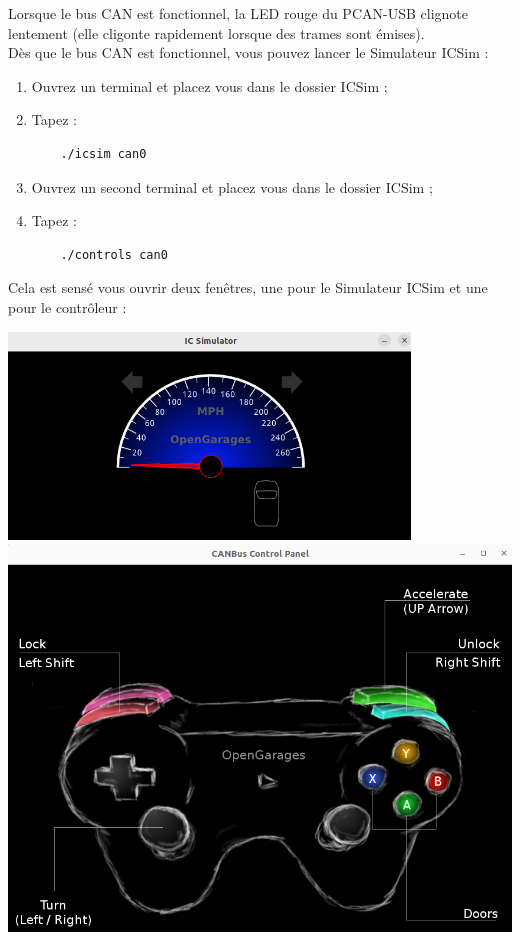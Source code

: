 Lorsque le bus CAN est fonctionnel, la LED rouge du PCAN-USB clignote lentement (elle cligonte rapidement lorsque des trames sont émises).\\

Dès que le bus CAN est fonctionnel, vous pouvez lancer le Simulateur ICSim :
\begin{enumerate}
    \item Ouvrez un terminal et placez vous dans le dossier ICSim ;
    \item Tapez :
\vspace{-1.8\baselineskip}
\begin{lstlisting}
    ./icsim can0
\end{lstlisting}
    \item Ouvrez un second terminal et placez vous dans le dossier ICSim ;
    \item Tapez :
\vspace{-1.8\baselineskip}
\begin{lstlisting}
    ./controls can0
\end{lstlisting}
\end{enumerate}

Cela est sensé vous ouvrir deux fenêtres, une pour le Simulateur ICSim et une pour le contrôleur : 

\begin{minipage}
    \textwidth
    \centering
    \includegraphics[width=0.80\textwidth]{../figures/ICSIM.png}
    \includegraphics[width=\textwidth]{../figures/CONTROLEUR.png}
\end{minipage}


